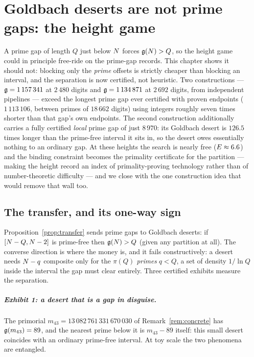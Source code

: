 \chapter{Goldbach deserts are not prime gaps: the height game}
\label{ch:gaps}

\begin{chapterabstract}
A prime gap of length $Q$ just below $N$ forces $\mathfrak{g}(N)>Q$, so the
height game could in principle free-ride on the prime-gap records. This
chapter shows it should not: blocking only the \emph{prime} offsets is
strictly cheaper than blocking an interval, and the separation is now
certified, not heuristic. Two constructions --- $\mathfrak{g}=1\,157\,341$ at
$2\,480$ digits and $\mathfrak{g}=1\,134\,871$ at $2\,692$ digits, from
independent pipelines --- exceed the longest prime gap ever certified
with proven endpoints ($1\,113\,106$, between primes of $18\,662$
digits) using integers roughly seven times shorter than that gap's own
endpoints. The second construction additionally carries a fully
certified \emph{local} prime gap of just $8\,970$: its Goldbach desert
is $126.5$ times longer than the prime-free interval it sits in, so the
desert owes essentially nothing to an ordinary gap. At these heights the
search is nearly free ($E\approx6.6$) and the binding constraint
becomes the primality certificate for the partition --- making the
height record an index of primality-proving technology rather than of
number-theoretic difficulty --- and we close with the one construction
idea that would remove that wall too.
\end{chapterabstract}

\section{The transfer, and its one-way sign}\label{sec:transfer5}

Proposition~\ref{prop:transfer} sends prime gaps to Goldbach deserts:
if $[N-Q,N-2]$ is prime-free then $\mathfrak{g}(N)>Q$ (given any partition at
all). The converse direction is where the money is, and it fails
constructively: a desert needs $N-q$ composite only for the
$\pi(Q)$ \emph{primes} $q<Q$, a set of density $1/\ln Q$ inside the
interval the gap must clear entirely. Three certified exhibits measure
the separation.

\paragraph{Exhibit 1: a desert that is a gap in disguise.} The
primorial $m_{43}=13\,082\,761\,331\,670\,030$ of
Remark~\ref{rem:concrete} has $\mathfrak{g}(m_{43})=89$, and the nearest prime
below it is $m_{43}-89$ itself: this small desert coincides with an
ordinary prime-free interval. At toy scale the two phenomena are
entangled.

